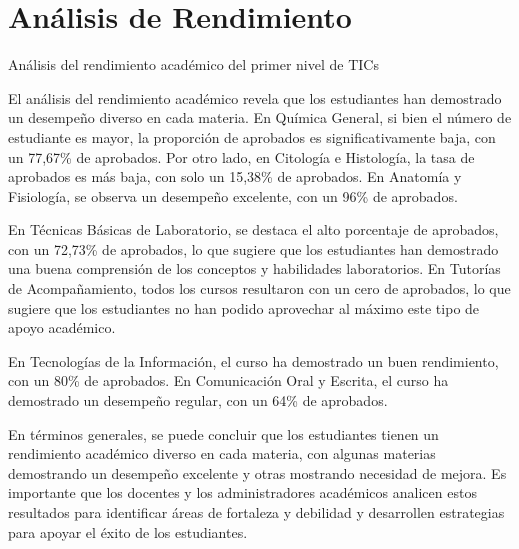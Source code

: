 \vspace{1cm}
\section{Análisis de Rendimiento}
Análisis del rendimiento académico del primer nivel de TICs

El análisis del rendimiento académico revela que los estudiantes han demostrado un desempeño diverso en cada materia. En Química General, si bien el número de estudiante es mayor, la proporción de aprobados es significativamente baja, con un 77,67\% de aprobados. Por otro lado, en Citología e Histología, la tasa de aprobados es más baja, con solo un 15,38\% de aprobados. En Anatomía y Fisiología, se observa un desempeño excelente, con un 96\% de aprobados.

En Técnicas Básicas de Laboratorio, se destaca el alto porcentaje de aprobados, con un 72,73\% de aprobados, lo que sugiere que los estudiantes han demostrado una buena comprensión de los conceptos y habilidades laboratorios. En Tutorías de Acompañamiento, todos los cursos resultaron con un cero de aprobados, lo que sugiere que los estudiantes no han podido aprovechar al máximo este tipo de apoyo académico.

En Tecnologías de la Información, el curso ha demostrado un buen rendimiento, con un 80\% de aprobados. En Comunicación Oral y Escrita, el curso ha demostrado un desempeño regular, con un 64\% de aprobados.

En términos generales, se puede concluir que los estudiantes tienen un rendimiento académico diverso en cada materia, con algunas materias demostrando un desempeño excelente y otras mostrando necesidad de mejora. Es importante que los docentes y los administradores académicos analicen estos resultados para identificar áreas de fortaleza y debilidad y desarrollen estrategias para apoyar el éxito de los estudiantes.

